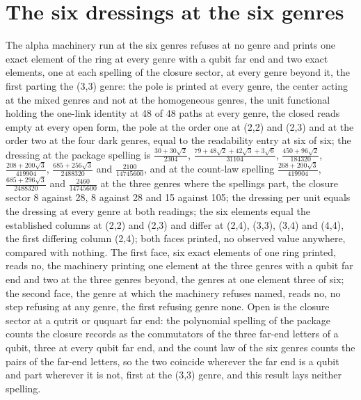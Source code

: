 \section{The six dressings at the six genres}\label{mod:VIII-1-D542965-w-sxdr}
\begin{chwall}\label{box:VIII-1-D542965-w-sxdr:1}
The alpha machinery run at the six genres refuses at no genre and prints one exact element of the ring at every genre with a qubit far end and two exact elements, one at each spelling of the closure sector, at every genre beyond it, the first parting the (3,3) genre: the pole is printed at every genre, the center acting at the mixed genres and not at the homogeneous genres, the unit functional holding the one-link identity at 48 of 48 paths at every genre, the closed reads empty at every open form, the pole at the order one at (2,2) and (2,3) and at the order two at the four dark genres, equal to the readability entry at six of six; the dressing at the package spelling is $\tfrac{30 + 30\sqrt{2}}{2304}$, $\tfrac{79 + 48\sqrt{2} + 42\sqrt{3} + 3\sqrt{6}}{31104}$, $\tfrac{450 + 96\sqrt{2}}{184320}$, $\tfrac{208 + 200\sqrt{3}}{419904}$, $\tfrac{685 + 256\sqrt{3}}{2488320}$ and $\tfrac{2100}{14745600}$, and at the count-law spelling $\tfrac{268 + 200\sqrt{3}}{419904}$, $\tfrac{685 + 296\sqrt{3}}{2488320}$ and $\tfrac{2460}{14745600}$ at the three genres where the spellings part, the closure sector 8 against 28, 8 against 28 and 15 against 105; the dressing per unit equals the dressing at every genre at both readings; the six elements equal the established columns at (2,2) and (2,3) and differ at (2,4), (3,3), (3,4) and (4,4), the first differing column (2,4); both faces printed, no observed value anywhere, compared with nothing.
The first face, six exact elements of one ring printed, reads no, the machinery printing one element at the three genres with a qubit far end and two at the three genres beyond, the genres at one element three of six; the second face, the genre at which the machinery refuses named, reads no, no step refusing at any genre, the first refusing genre none. Open is the closure sector at a qutrit or ququart far end: the polynomial spelling of the package counts the closure records as the commutators of the three far-end letters of a qubit, three at every qubit far end, and the count law of the six genres counts the pairs of the far-end letters, so the two coincide wherever the far end is a qubit and part wherever it is not, first at the (3,3) genre, and this result lays neither spelling.
\end{chwall}
